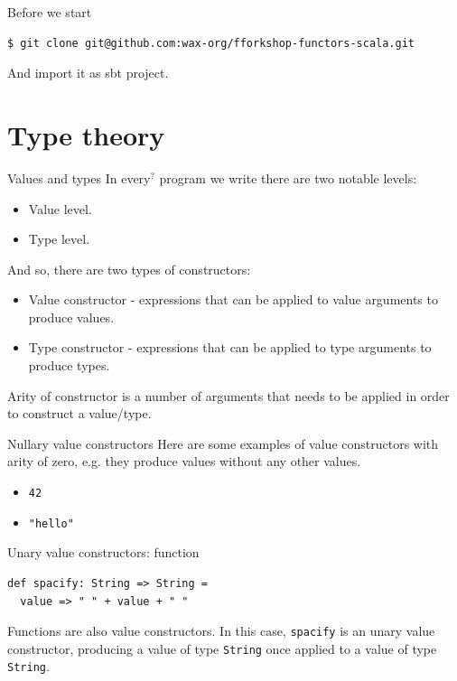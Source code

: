 \documentclass[presentation,aspectratio=169,smaller]{beamer}
\begin{document}
\begin{frame}[label={sec:org1bf2e6d},fragile]{Before we start}
 \begin{verbatim}
$ git clone git@github.com:wax-org/fforkshop-functors-scala.git
\end{verbatim}

And import it as sbt project.
\end{frame}

\section{Type theory}
\label{sec:org6c875b3}
\begin{frame}[label={sec:org369d802}]{Values and types}
In every\(^{?}\) program we write there are two notable levels:

\begin{itemize}
\item Value level.
\item Type level.
\end{itemize}

\pause

And so, there are two types of constructors:

\begin{itemize}
\item \alert{Value constructor} - expressions that can be applied to value arguments to
produce values.
\item \alert{Type constructor} - expressions that can be applied to type arguments to
produce types.
\end{itemize}

\pause

\alert{Arity} of constructor is a number of arguments that needs to be applied in
order to construct a value/type.
\end{frame}

\begin{frame}[label={sec:org5c1f5b0},fragile]{Nullary value constructors}
 Here are some examples of value constructors with arity of zero, e.g. they
produce values without any other values.

\begin{itemize}
\item \texttt{42}
\item \texttt{"hello"}
\end{itemize}
\end{frame}

\begin{frame}[label={sec:org49bb16a},fragile]{Unary value constructors: function}
 \begin{verbatim}
def spacify: String => String =
  value => " " + value + " "
\end{verbatim}

Functions are also value constructors. In this case, \texttt{spacify} is an unary value
constructor, producing a value of type \texttt{String} once applied to a value of type
\texttt{String}.
\end{frame}
\end{document}
